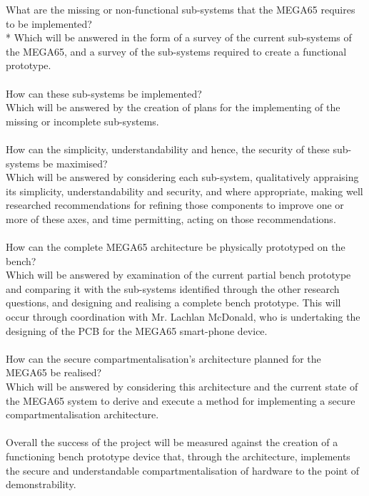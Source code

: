What are the missing or non-functional sub-systems that the MEGA65 requires to be implemented?\\*
Which will be answered in the form of a survey of the current sub-systems of the MEGA65, and a survey of the sub-systems required to create a functional prototype.\\
\\
How can these sub-systems be implemented?\\
Which will be answered by the creation of plans for the implementing of the missing or incomplete sub-systems.\\
\\
How can the simplicity, understandability and hence, the security of these sub-systems be maximised?\\
Which will be answered by considering each sub-system, qualitatively appraising its simplicity, understandability and security, and where appropriate, making well researched recommendations for refining those components to improve one or more of these axes, and time permitting, acting on those recommendations.\\
\\
How can the complete MEGA65 architecture be physically prototyped on the bench?\\
Which will be answered by examination of the current partial bench prototype and comparing it with the sub-systems identified through the other research questions, and designing and realising a complete bench prototype. This will occur through coordination with Mr. Lachlan McDonald, who is undertaking the designing of the PCB for the MEGA65 smart-phone device.\\
\\
How can the secure compartmentalisation's architecture planned for the MEGA65 be realised?\\
Which will be answered by considering this architecture and the current state of the MEGA65 system to derive and execute a method for implementing a secure compartmentalisation architecture.\\
\\
Overall the success of the project will be measured against the creation of a functioning bench prototype device that, through the architecture, implements the secure and understandable compartmentalisation of hardware to the point of demonstrability.


